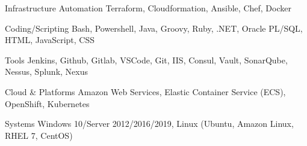 

\begin{cvskills}

  \cvskill
    {Infrastructure Automation} %
    {Terraform, Cloudformation, Ansible, Chef, Docker} %

  \cvskill
    {Coding/Scripting} %
    {Bash, Powershell, Java, Groovy, Ruby, .NET, Oracle PL/SQL, HTML, JavaScript, CSS} %

  \cvskill
    {Tools} %
    {Jenkins, Github, Gitlab, VSCode, Git, IIS, Consul, Vault, SonarQube, Nessus, Splunk, Nexus} %

  \cvskill
    {Cloud \& Platforms} %
    {Amazon Web Services, Elastic Container Service (ECS), OpenShift, Kubernetes} %

  \cvskill
    {Systems} %
    {Windows 10/Server 2012/2016/2019, Linux (Ubuntu, Amazon Linux, RHEL 7, CentOS)} %

\end{cvskills}
